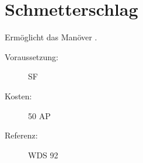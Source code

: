 \section{Schmetterschlag}
\label{sf.schmetterschlag}
Ermöglicht das Manöver .
\begin{description}
    \item[Voraussetzung:]
        SF 
    \item [Kosten:]
        50 AP
    \item [Referenz:]
        WDS 92
\end{description}
